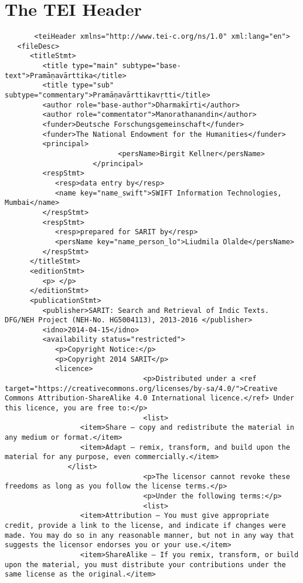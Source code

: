\documentclass[article,12pt,a4paper]{memoir}
\begin{document}
	 \chapter{The TEI Header}
	 \begin{verbatim}
       <teiHeader xmlns="http://www.tei-c.org/ns/1.0" xml:lang="en">
   <fileDesc>
      <titleStmt>
         <title type="main" subtype="base-text">Pramāṇavārttika</title>
         <title type="sub" subtype="commentary">Pramāṇavārttikavṛtti</title>
         <author role="base-author">Dharmakīrti</author>
         <author role="commentator">Manorathanandin</author>
         <funder>Deutsche Forschungsgemeinschaft</funder>
         <funder>The National Endowment for the Humanities</funder>
         <principal>
					       <persName>Birgit Kellner</persName>
				     </principal>
         <respStmt>
            <resp>data entry by</resp>
            <name key="name_swift">SWIFT Information Technologies, Mumbai</name>
         </respStmt>
         <respStmt>
            <resp>prepared for SARIT by</resp>
            <persName key="name_person_lo">Liudmila Olalde</persName>
         </respStmt>
      </titleStmt>
      <editionStmt>
         <p> </p>
      </editionStmt>
      <publicationStmt>
         <publisher>SARIT: Search and Retrieval of Indic Texts. DFG/NEH Project (NEH-No. HG5004113), 2013-2016 </publisher>
         <idno>2014-04-15</idno>
         <availability status="restricted">
            <p>Copyright Notice:</p>
            <p>Copyright 2014 SARIT</p>
            <licence> 
						         <p>Distributed under a <ref target="https://creativecommons.org/licenses/by-sa/4.0/">Creative Commons Attribution-ShareAlike 4.0 International licence.</ref> Under this licence, you are free to:</p>
						         <list>
                  <item>Share — copy and redistribute the material in any medium or format.</item>
                  <item>Adapt — remix, transform, and build upon the material for any purpose, even commercially.</item>
               </list>
						         <p>The licensor cannot revoke these freedoms as long as you follow the license terms.</p>
						         <p>Under the following terms:</p>
						         <list>
                  <item>Attribution — You must give appropriate credit, provide a link to the license, and indicate if changes were made. You may do so in any reasonable manner, but not in any way that suggests the licensor endorses you or your use.</item>
                  <item>ShareAlike — If you remix, transform, or build upon the material, you must distribute your contributions under the same license as the original.</item>

\end{verbatim}
\end{document}
